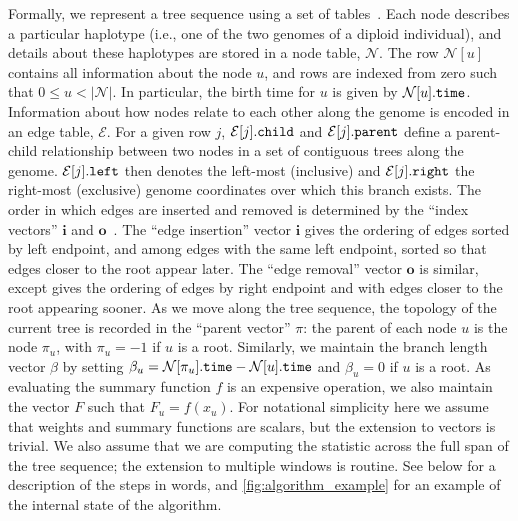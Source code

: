 \documentclass[9pt,twoside,lineno]{gsajnl}
\newcommand{\Nt}{\mathcal{N}}  %
\newcommand{\Et}{\mathcal{E}}  %
\newcommand{\prop}[1]{.\mbox{\texttt{#1}}} %
\newcommand{\indexin}[0]{\ensuremath{\mathbf{i}}}
\newcommand{\indexout}[0]{\ensuremath{\mathbf{o}}}
\begin{document}
Formally, we represent a tree sequence using a set of tables~\citep{kelleher2018efficient}.
Each node describes a particular haplotype (i.e., one of the two genomes of a diploid individual),
and details about these haplotypes are stored in a node table, $\Nt$.
The row $\Nt[u]$ contains all information about the node $u$, and rows
are indexed from zero such that $0 \leq u < |\Nt|$.
In particular, the birth time for $u$ is given by $\Nt[u]\prop{time}$.
Information about how nodes relate to each
other along the genome is encoded in an edge table, $\Et$.
For a given row $j$, $\Et[j]\prop{child}$ and $\Et[j]\prop{parent}$
define a parent-child relationship between two nodes in a set of
contiguous trees along the genome. $\Et[j]\prop{left}$ then denotes
the left-most (inclusive) and $\Et[j]\prop{right}$ the right-most
(exclusive) genome coordinates over which this branch exists.
The order in which edges are inserted and removed is determined
by the ``index vectors'' $\indexin$ and $\indexout$~\citep{kelleher2016efficient}.
The ``edge insertion'' vector $\indexin$ gives the ordering of edges
sorted by left endpoint, and among edges with the same left endpoint,
sorted so that edges closer to the root appear later.
The ``edge removal'' vector $\indexout$ is similar, except gives the ordering of edges
by right endpoint and with edges closer to the root appearing sooner.
As we move along the tree sequence, the topology of the current tree is recorded in the
``parent vector'' $\pi$: the parent of each node $u$ is the node $\pi_u$,
with $\pi_u = -1$ if $u$ is a root.
Similarly, we maintain the branch length vector $\beta$ by setting
$\beta_u = \Nt[\pi_u]\prop{time} - \Nt[u]\prop{time}$ and
$\beta_u = 0$ if $u$ is a root. As evaluating the summary function
$f$ is an expensive operation, we also maintain the vector $F$
such that $F_u = f(x_u)$. For notational simplicity here we assume
that weights and summary functions are scalars, but the extension to
vectors is trivial. We also assume that we are computing the statistic
across the full span of the tree sequence; the extension to multiple windows is routine.
See below for a description of the steps in words,
and \autoref{fig:algorithm_example} for an example of the internal state of the algorithm.
\end{document}
